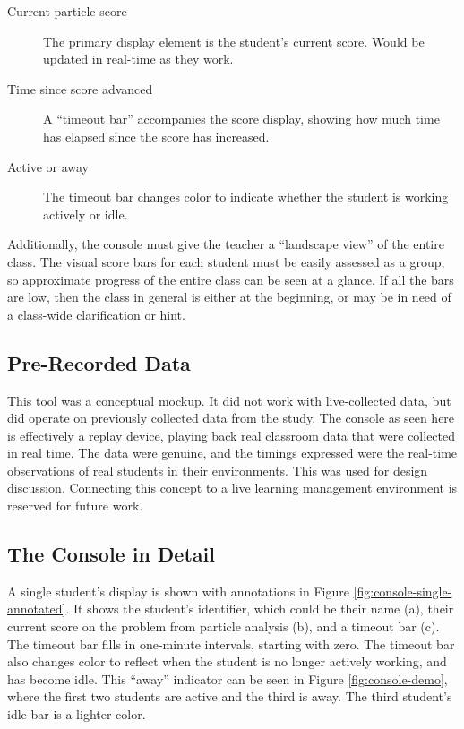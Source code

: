 \begin{description}
\item [Current particle score] The primary display element is the student's current score. Would be updated in real-time as they work.
\item [Time since score advanced] A ``timeout bar'' accompanies the score display, showing how much time has elapsed since the score has increased.
\item [Active or away] The timeout bar changes color to indicate whether the student is working actively or idle.
\end{description}

Additionally, the console must give the teacher a ``landscape view'' of the entire class. The visual score bars for each student must be easily assessed as a group, so approximate progress of the entire class can be seen at a glance. If all the bars are low, then the class in general is either at the beginning, or may be in need of a class-wide clarification or hint. 

\subsection{Pre-Recorded Data}
This tool was a conceptual mockup. It did not work with live-collected data, but did operate on previously collected data from the study. The console as seen here is effectively a replay device, playing back real classroom data that were collected in real time. The data were genuine, and the timings expressed were the real-time observations of real students in their environments. This was used for design discussion. Connecting this concept to a live learning management environment is reserved for future work. 

\subsection{The Console in Detail}
A single student's display is shown with annotations in Figure \ref{fig:console-single-annotated}. It shows the student's identifier, which could be their name (a), their current score on the problem from particle analysis (b), and a timeout bar (c). The timeout bar fills in one-minute intervals, starting with zero. The timeout bar also changes color to reflect when the student is no longer actively working, and has become idle. This ``away'' indicator can be seen in Figure \ref{fig:console-demo}, where the first two students are active and the third is away. The third student's idle bar is a lighter color.

